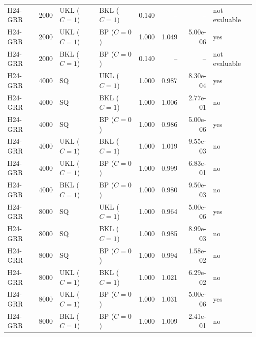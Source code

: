 \begin{tabular}{lrllrrrl}
H24-GRR & 2000 & UKL ($C=1$) & BKL ($C=1$) & 0.140 & -- & -- & not evaluable \\
H24-GRR & 2000 & UKL ($C=1$) & BP ($C=0$) & 1.000 & 1.049 & 5.00e-06 & yes \\
H24-GRR & 2000 & BKL ($C=1$) & BP ($C=0$) & 0.140 & -- & -- & not evaluable \\
H24-GRR & 4000 & SQ & UKL ($C=1$) & 1.000 & 0.987 & 8.30e-04 & yes \\
H24-GRR & 4000 & SQ & BKL ($C=1$) & 1.000 & 1.006 & 2.77e-01 & no \\
H24-GRR & 4000 & SQ & BP ($C=0$) & 1.000 & 0.986 & 5.00e-06 & yes \\
H24-GRR & 4000 & UKL ($C=1$) & BKL ($C=1$) & 1.000 & 1.019 & 9.55e-03 & no \\
H24-GRR & 4000 & UKL ($C=1$) & BP ($C=0$) & 1.000 & 0.999 & 6.83e-01 & no \\
H24-GRR & 4000 & BKL ($C=1$) & BP ($C=0$) & 1.000 & 0.980 & 9.50e-03 & no \\
H24-GRR & 8000 & SQ & UKL ($C=1$) & 1.000 & 0.964 & 5.00e-06 & yes \\
H24-GRR & 8000 & SQ & BKL ($C=1$) & 1.000 & 0.985 & 8.99e-03 & no \\
H24-GRR & 8000 & SQ & BP ($C=0$) & 1.000 & 0.994 & 1.58e-02 & no \\
H24-GRR & 8000 & UKL ($C=1$) & BKL ($C=1$) & 1.000 & 1.021 & 6.29e-02 & no \\
H24-GRR & 8000 & UKL ($C=1$) & BP ($C=0$) & 1.000 & 1.031 & 5.00e-06 & yes \\
H24-GRR & 8000 & BKL ($C=1$) & BP ($C=0$) & 1.000 & 1.009 & 2.41e-01 & no \\
\hline
\end{tabular}
